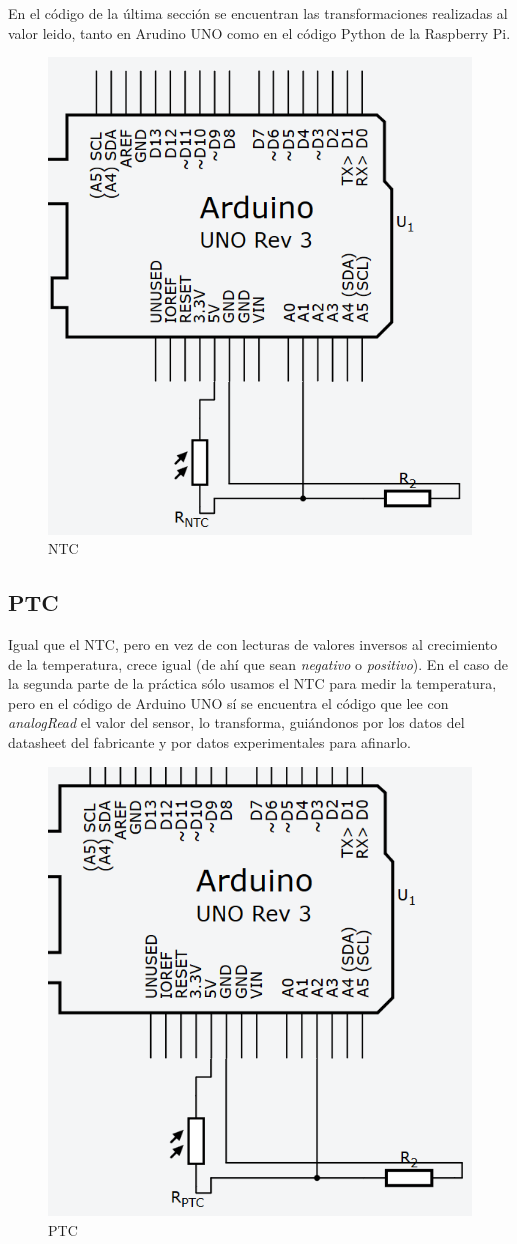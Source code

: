 \documentclass[]{article}
\begin{document}
En el código de la última sección se encuentran las transformaciones realizadas al valor leido, tanto en Arudino UNO como en el código Python de la Raspberry Pi.

\begin{figure}[H]
	\centering
	\includegraphics[width=0.4\linewidth]{images/ntc.PNG}
	\caption{NTC}
	\label{fig:ntc}
\end{figure}

\subsection{PTC}

Igual que el NTC, pero en vez de con lecturas de valores inversos al crecimiento de la temperatura, crece igual (de ahí que sean \textit{negativo} o \textit{positivo}). En el caso de la segunda parte de la práctica sólo usamos el NTC para medir la temperatura, pero en el código de Arduino UNO sí se encuentra el código que lee con \textit{analogRead} el valor del sensor, lo transforma, guiándonos por los datos del datasheet del fabricante y por datos experimentales para afinarlo.

\begin{figure}[H]
	\centering
	\includegraphics[width=0.4\linewidth]{images/ptc.PNG}
	\caption{PTC}
	\label{fig:ptc}
\end{figure}
\end{document}
